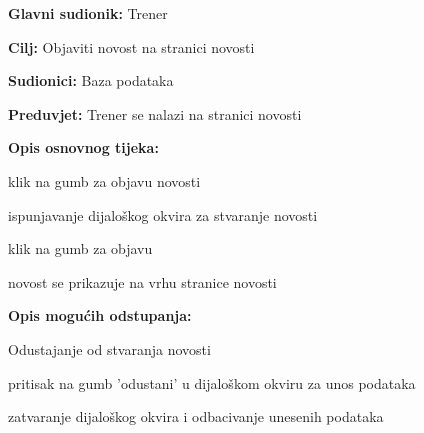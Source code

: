 					\noindent {}
					\begin{packed_item}
	
						\item \textbf{Glavni sudionik: }Trener
						\item  \textbf{Cilj: } Objaviti novost na stranici novosti
						\item  \textbf{Sudionici: } Baza podataka
						\item  \textbf{Preduvjet: } Trener se nalazi na stranici novosti
						\item  \textbf{Opis osnovnog tijeka:}
						
						\item[] \begin{packed_enum}
	
							\item klik na gumb za objavu novosti
							\item ispunjavanje dijaloškog okvira za stvaranje novosti
							\item klik na gumb za objavu
							\item novost se prikazuje na vrhu stranice novosti
							
						\end{packed_enum}
						
						\item  \textbf{Opis mogućih odstupanja:}
						
						\item[] \begin{packed_item}
	
							\item Odustajanje od stvaranja novosti
							\item[] \begin{packed_enum}
								
								\item pritisak na gumb 'odustani' u dijaloškom okviru za unos podataka
								\item zatvaranje dijaloškog okvira i odbacivanje unesenih podataka
								
							\end{packed_enum}
							
						\end{packed_item}
					\end{packed_item}
					
